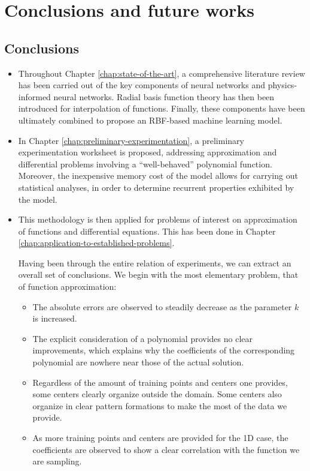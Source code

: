 \documentclass[12pt]{report} %
\begin{document}
\chapter{Conclusions and future works}

\section*{Conclusions}

\begin{itemize}
  \item Throughout Chapter \ref{chap:state-of-the-art}, a comprehensive literature review has been carried out of the key components of neural networks and physics-informed neural networks. Radial basis function theory has then been introduced for interpolation of functions. Finally, these components have been ultimately combined to propose an RBF-based machine learning model.
  \item In Chapter \ref{chap:preliminary-experimentation}, a preliminary experimentation worksheet is proposed, addressing approximation and differential problems involving a ``well-behaved'' polynomial function. Moreover, the inexpensive memory cost of the model allows for carrying out statistical analyses, in order to determine recurrent properties exhibited by the model.
  \item This methodology is then applied for problems of interest on approximation of functions and differential equations. This has been done in Chapter \ref{chap:application-to-established-problems}. 
  
  Having been through the entire relation of experiments, we can extract an overall set of conclusions. We begin with the most elementary problem, that of function approximation:\begin{itemize}
    \item The absolute errors are observed to steadily decrease as the parameter $k$ is increased. 
    \item The explicit consideration of a polynomial provides no clear improvements, which explains why the coefficients of the corresponding polynomial are nowhere near those of the actual solution.
    \item Regardless of the amount of training points and centers one provides, some centers clearly organize outside the domain. Some centers also organize in clear pattern formations to make the most of the data we provide.
    \item As more training points and centers are provided for the 1D case, the coefficients are observed to show a clear correlation with the function we are sampling.
  \end{itemize}


\end{itemize}
\end{document}
